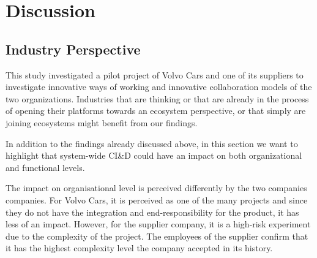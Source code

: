 \section{Discussion}\label{sec:discussion}



\subsection{Industry Perspective}

This study investigated a pilot project of Volvo Cars and one of its suppliers to investigate innovative ways of working and innovative collaboration models of the two organizations. Industries that are thinking or that are already in the process of opening their platforms towards an ecosystem perspective, or that simply are joining ecosystems might benefit from our findings.

In addition to the findings already discussed above, in this section we want to highlight that system-wide CI\&D could have an impact on both organizational and functional levels. 

%
The impact on organisational level is perceived differently by the two companies companies. For Volvo Cars, it is perceived as one of the many projects and since they do not have the integration and end-responsibility for the product, it has less of an impact. However, for the supplier company, it is a high-risk experiment due to the complexity of the project. The employees of the supplier confirm that it has the highest complexity level the company accepted in its history.

